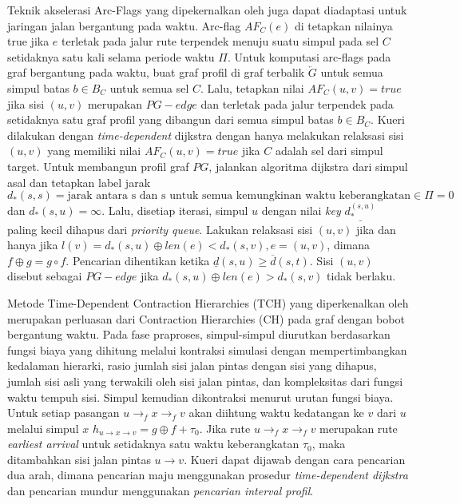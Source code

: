 Teknik akselerasi Arc-Flags yang dipekernalkan oleh \cite{Kohler2005} juga dapat diadaptasi untuk jaringan jalan bergantung pada waktu. Arc-flag $AF_C(e)$ di tetapkan nilainya true jika $e$ terletak pada jalur rute terpendek menuju suatu simpul pada sel $C$ setidaknya satu kali selama periode waktu $\Pi$. Untuk komputasi arc-flags pada graf bergantung pada waktu, buat graf profil di graf terbalik $\overleftarrow{G}$ untuk semua simpul batas $b\in B_C$ untuk semua sel $C$. Lalu, tetapkan nilai $AF_C(u,v)=true$ jika sisi $(u,v)$ merupakan $PG-edge$ dan terletak pada jalur terpendek pada setidaknya satu graf profil yang dibangun dari semua simpul batas $b\in B_C$. Kueri dilakukan dengan \textit{time-dependent} dijkstra dengan hanya melakukan relaksasi sisi $(u,v)$ yang memiliki nilai $AF_C(u,v)=true$ jika $C$ adalah sel dari simpul target. Untuk membangun profil graf $PG$, jalankan algoritma dijkstra dari simpul asal dan tetapkan label jarak $d_*(s,s)=\text{jarak antara s dan s untuk semua kemungkinan waktu keberangkatan} \in \Pi=0$ dan $d_*(s,u)=\infty$. Lalu, disetiap iterasi, simpul $u$ dengan nilai \textit{key} $\underline{d_*^{(s,u)}}$ paling kecil dihapus dari \textit{priority queue}. Lakukan relaksasi sisi $(u,v)$ jika dan hanya jika $l(v)=d_*(s,u)\oplus len(e)<d_*(s,v) , e=(u,v)$, dimana $f\oplus g=g\circ f$. Pencarian dihentikan ketika $\underline{d}(s,u)\geq \overline{d}(s,t)$. Sisi $(u,v)$ disebut sebagai $PG-edge$ jika $d_*(s,u)\oplus len(e)>d_*(s,v)$ tidak berlaku.



Metode Time-Dependent Contraction Hierarchies (TCH) yang diperkenalkan oleh \cite{Veit2013} merupakan perluasan dari Contraction Hierarchies (CH) pada graf dengan bobot bergantung waktu. Pada fase praproses, simpul-simpul diurutkan berdasarkan fungsi biaya yang dihitung melalui kontraksi simulasi dengan mempertimbangkan kedalaman hierarki, rasio jumlah sisi jalan pintas dengan sisi yang dihapus, jumlah sisi asli yang terwakili oleh sisi jalan pintas, dan kompleksitas dari fungsi waktu tempuh sisi. Simpul kemudian dikontraksi menurut urutan fungsi biaya. Untuk setiap pasangan $u\rightarrow_f x \rightarrow_f v$ akan diihtung waktu kedatangan ke $v$ dari $u$ melalui simpul $x$ $h_{u\rightarrow x \rightarrow v}=g\oplus f + \tau_0$. Jika rute $u\rightarrow_f x \rightarrow_f v$ merupakan rute \textit{earliest arrival} untuk setidaknya satu waktu keberangkatan $\tau_0$, maka ditambahkan sisi jalan pintas $u\rightarrow v$. Kueri dapat dijawab dengan cara pencarian dua arah, dimana pencarian maju menggunakan prosedur \textit{time-dependent dijkstra} dan pencarian mundur menggunakan \textit{pencarian interval profil}.

